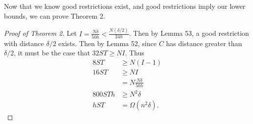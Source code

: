Now that we know good restrictions exist, and good restrictions imply our lower bounds, we can prove Theorem 2.
\begin{proof}[Proof of Theorem 2]
Let $I=\frac{N\delta}{50h}<\frac{N(\delta/2)}{24h}$. Then by Lemma 53, a good restriction with distance $\delta/2$ exists. Then by Lemma 52, since $C$ has distance greater than $\delta/2$, it must be the case that $32ST\ge NI$. Thus
\begin{align*}8ST&\ge N(I-1)\\16ST&\ge NI\\&=N\frac{N\delta}{50h}\\800STh&\ge N^2\delta\\hST&=\Omega(n^2\delta).\end{align*}
\end{proof}
